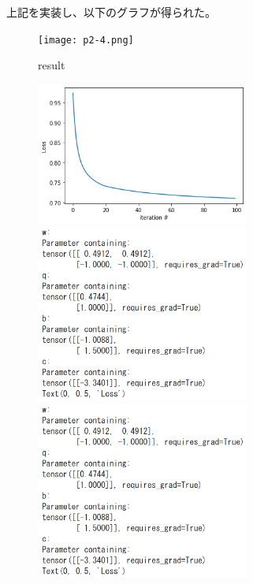 \documentclass[a4j,11pt]{jarticle}
\begin{document}
上記を実装し、以下のグラフが得られた。
\begin{figure}[htbp]
    \centering
    \texttt{[image: p2-4.png]}
    \caption{result}
\end{figure}

\begin{figure}[htbp]
    \begin{minipage}{0.5\hsize}
     \begin{center}
      \includegraphics[width=70mm]{p2-1.png}
     \end{center}
    \end{minipage}
    \begin{minipage}{0.5\hsize}
     \begin{center}
      \includegraphics[width=70mm]{p2-2.png}
     \end{center}
    \end{minipage}
    \begin{minipage}{0.5\hsize}
     \begin{center}
      \includegraphics[width=70mm]{p2-2.png}
     \end{center}
    \end{minipage}
\end{figure}
\end{document}

